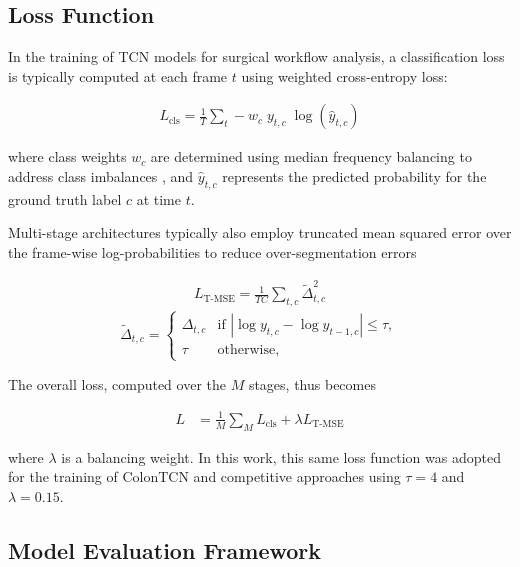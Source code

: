 


\subsection{Loss Function}
\label{subsec:loss}
In the training of TCN models for surgical workflow analysis, a classification loss is typically computed at each frame $t$ using weighted cross-entropy loss:

\begin{align}
L_{\text{cls}} = \frac{1}{T} \sum_{t} - w_c \; y_{t,c} \; \log(\hat{y}_{t,c})
\end{align}

where class weights \( w_c \) are determined using median frequency balancing to address class imbalances \cite{czempiel2020tecno}, and \( \hat{y}_{t,c} \) represents the predicted probability for the ground truth label \( c \) at time \( t \).

Multi-stage architectures typically also employ truncated mean squared error over the frame-wise log-probabilities to reduce over-segmentation errors \cite{li2020ms}

\begin{align}
L_{\text{T-MSE}} = \frac{1}{TC} \sum_{t,c} \tilde{\Delta}_{t,c}^2
\end{align}
\begin{equation}
\tilde{\Delta}_{t,c} = 
\begin{cases} 
\Delta_{t,c} & \text{if } |\log y_{t,c} - \log y_{t-1,c}| \leq \tau, \\
\tau & \text{otherwise},
\end{cases}
\end{equation}


The overall loss, computed over the  \( M \) stages, thus becomes

\begin{align}
L &= \frac{1}{M} \sum_{M} L_{\text{cls}} + \lambda L_{\text{T-MSE}} 
\end{align}

where \( \lambda \) is a balancing weight. In this work, this same loss function was adopted for the training of ColonTCN and competitive approaches using $\tau=4$ and $\lambda=0.15$.

\subsection{Model Evaluation Framework}
\label{subsec:dataset}

